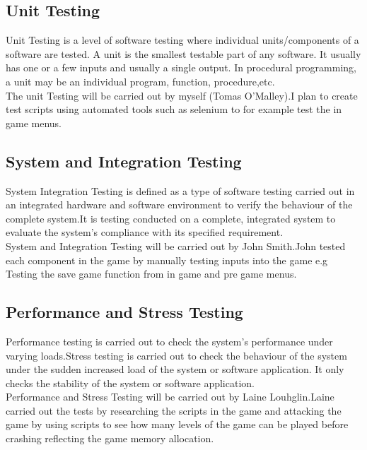 \subsection{Unit Testing}
Unit Testing is a level of software testing where individual units/components of a software are tested. A unit is the smallest testable part of any software. It usually has one or a few inputs and usually a single output. In procedural programming, a unit may be an individual program, function, procedure,etc.\\

The unit Testing will be carried out by myself (Tomas O'Malley).I plan to create test scripts using automated tools such as selenium to for example test the in game menus.\\

\subsection{System and Integration Testing}
System Integration Testing is defined as a type of software testing carried out in an integrated hardware and software environment to verify the behaviour of the complete system.It is testing conducted on a complete, integrated system to evaluate the system's compliance with its specified requirement.\\

System  and Integration Testing will be carried out by John Smith.John tested each component in the game by manually testing inputs into the game e.g Testing the save game function from in game and pre game menus.\\ 

\subsection{Performance and Stress Testing}
Performance testing is carried out to check the system's performance under varying loads.Stress testing is carried out to check the behaviour of the system under the sudden increased load of the system or software application. It only checks the stability of the system or software application.\\


Performance and Stress Testing will be carried out by Laine Louhglin.Laine carried out the tests by researching the scripts in the game and attacking the game by using scripts to see how many levels of the game can be played before crashing reflecting the game memory allocation.



